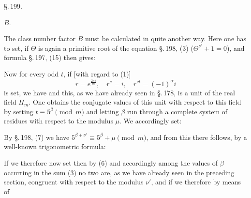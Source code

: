 
\begin{center}
\S.\,199.

 $B$.
\end{center}

The class number factor $B$ must be calculated in quite another way. Here one has to set, if $\Theta$ is again a primitive root
of the equation \S.\,198, (3) ($\Theta^{\nu'} + 1 = 0$),
and formula \S.\,197, (15) then gives:

Now for every odd $t$, if [with regard to (1)]
\[
r = e^{\frac{2\pi i}{m}}, \quad r^\nu = i, \quad r^{\nu t} = (-1)^\alpha i
\]
is set, we have
and this, as we have already seen in \S.\,178, is a unit of the real field $H_m$. One obtains the conjugate values
of this unit with respect to this field by setting $t \equiv 5^\beta \pmod{m}$ and letting $\beta$ run through a complete system of residues with respect to the modulus $\mu$.
We accordingly set:

By \S.\,198, (7) we have $5^{\beta+\nu'} \equiv 5^\beta + \mu \pmod{m}$, and from this
there follows, by a well-known trigonometric formula:

If we therefore now set
then by (6)
and accordingly
among the values of $\beta$ occurring in the sum (3)
no two are, as we have already seen in the preceding section,
congruent with respect to the modulus $\nu'$, and if we therefore by means of
